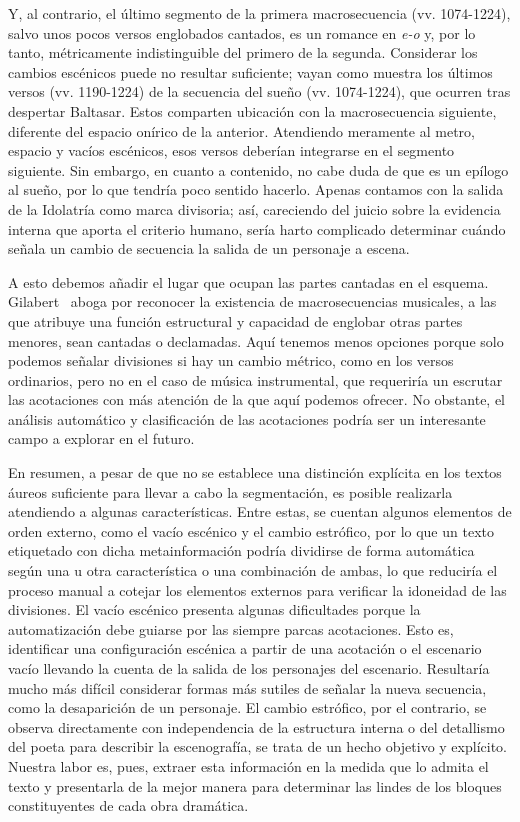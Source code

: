 Y, al contrario, el último segmento de la primera macrosecuencia (vv. 1074-1224), salvo unos pocos versos englobados cantados, es un romance en \textit{e-o} y, por lo tanto, métricamente indistinguible del primero de la segunda. Considerar los cambios escénicos puede no resultar suficiente; vayan como muestra los últimos versos (vv. 1190-1224) de la secuencia del sueño (vv. 1074-1224), que ocurren tras despertar Baltasar. Estos comparten ubicación con la macrosecuencia siguiente, diferente del espacio onírico de la anterior. Atendiendo meramente al metro, espacio y vacíos escénicos, esos versos deberían integrarse en el segmento siguiente. Sin embargo, en cuanto a contenido, no cabe duda de que es un epílogo al sueño, por lo que tendría poco sentido hacerlo. Apenas contamos con la salida de la Idolatría como marca divisoria; así, careciendo del juicio sobre la evidencia interna que aporta el criterio humano, sería harto complicado determinar cuándo señala un cambio de secuencia la salida de un personaje a escena.

A esto debemos añadir el lugar que ocupan las partes cantadas en el esquema. Gilabert~\parencite*[84]{gilabert2014} aboga por reconocer la existencia de macrosecuencias musicales, a las que atribuye una función estructural y capacidad de englobar otras partes menores, sean cantadas o declamadas. Aquí tenemos menos opciones porque solo podemos señalar divisiones si hay un cambio métrico, como en los versos ordinarios, pero no en el caso de música instrumental, que requeriría un escrutar las acotaciones con más atención de la que aquí podemos ofrecer. No obstante, el análisis automático y clasificación de las acotaciones podría ser un interesante campo a explorar en el futuro.

En resumen, a pesar de que no se establece una distinción explícita en los textos áureos suficiente para llevar a cabo la segmentación, es posible realizarla atendiendo a algunas características. Entre estas, se cuentan algunos elementos de orden externo, como el vacío escénico y el cambio estrófico, por lo que un texto etiquetado con dicha metainformación podría dividirse de forma automática según una u otra característica o una combinación de ambas, lo que reduciría el proceso manual a cotejar los elementos externos para verificar la idoneidad de las divisiones. El vacío escénico presenta algunas  dificultades porque la automatización debe guiarse por las siempre parcas acotaciones. Esto es, identificar una configuración escénica a partir de una acotación o el escenario vacío llevando la cuenta de la salida de los personajes del escenario. Resultaría mucho más difícil considerar formas más sutiles de señalar la nueva secuencia, como la desaparición de un personaje. El cambio estrófico, por el contrario, se observa directamente con independencia de la estructura interna o del detallismo del poeta para describir la escenografía, se trata de un hecho objetivo y explícito. Nuestra labor es, pues, extraer esta información en la medida que lo admita el texto y presentarla de la mejor manera para determinar las lindes de los bloques constituyentes de cada obra dramática.

